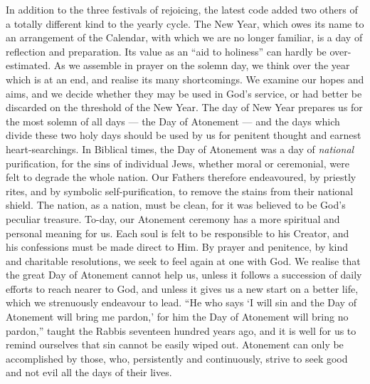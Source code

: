 In addition to the three festivals of
rejoicing, the latest code added two others of a
totally different kind to the yearly cycle.
The New Year, which owes its name to an
arrangement of the Calendar, with which we
are no longer familiar, is a day of reflection
and preparation. Its value as an “aid to
holiness” can hardly be over-estimated. As we
assemble in prayer on the solemn day, we
think over the year which is at an end, and
realise its many shortcomings. We examine
our hopes and aims, and we decide whether
they may be used in God’s service, or had
better be discarded on the threshold of the
New Year. The day of New Year prepares
us for the most solemn of all days — the Day
of Atonement — and the days which divide
these two holy days should be used by us for
penitent thought and earnest heart-searchings.
In Biblical times, the Day of Atonement
was a day of \textsl{national} purification,
for the sins of individual Jews, whether moral
or ceremonial, were felt to degrade the whole
nation. Our Fathers therefore endeavoured,
by priestly rites, and by symbolic
self-purification, to remove the stains from their
national shield. The nation, as a nation,
must be clean, for it was believed to be
God’s peculiar treasure. To-day, our
Atonement ceremony has a more spiritual
and personal meaning for us. Each soul is
felt to be responsible to his Creator, and
his confessions must be made direct to
Him. By prayer and penitence, by kind and
charitable resolutions, we seek to feel again
at one with God. We realise that the great
Day of Atonement cannot help us, unless it
follows a succession of daily efforts to reach
nearer to God, and unless it gives us a new
start on a better life, which we strenuously
endeavour to lead. “He who says ‘I will sin
and the Day of Atonement will bring me
pardon,’ for him the Day of Atonement
will bring no pardon,” taught the Rabbis
seventeen hundred years ago, and it is well
for us to remind ourselves that sin cannot be
easily wiped out. Atonement can only be
accomplished by those, who, persistently and
continuously, strive to seek good and not evil
all the days of their lives.

